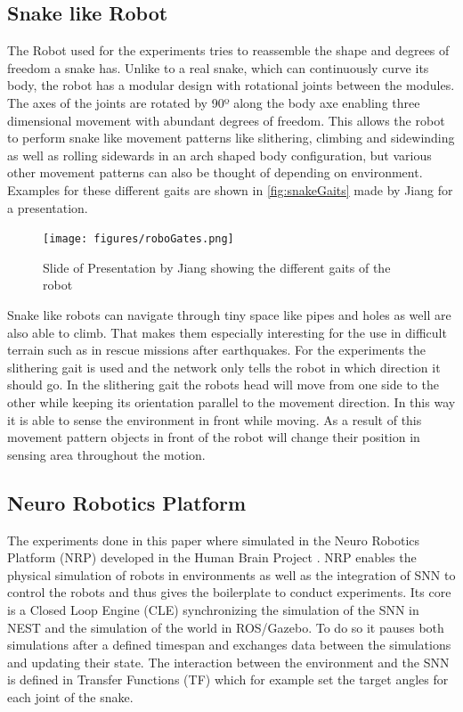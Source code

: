 \subsection{Snake like Robot}
The Robot used for the experiments tries to reassemble the shape and degrees of freedom a snake has. Unlike to a real snake, which can continuously curve its body, the robot has a modular design with rotational joints between the modules. The axes of the joints are rotated by 90º along the body axe enabling three dimensional movement with abundant degrees of freedom. This allows the robot to perform snake like movement patterns like slithering, climbing and sidewinding as well as rolling sidewards in an arch shaped body configuration, but various other movement patterns can also be thought of depending on environment. Examples for these different gaits are shown in \autoref{fig:snakeGaits} made by Jiang for a presentation\cite{snakeRobo}.
\newline
\begin{figure}[htpb]
  \centering
  \texttt{[image: figures/roboGates.png]}
  \caption{Slide of Presentation by Jiang showing the different gaits of the robot\cite{snakeRobo}}
  \label{fig:snakeGaits}
\end{figure}
Snake like robots can navigate through tiny space like pipes and holes as well are also able to climb. That makes them especially interesting for the use in difficult terrain such as in rescue missions after earthquakes.
For the experiments the slithering gait is used and the network only tells the robot in which direction it should go. In the slithering gait the robots head will move from one side to the other while keeping its orientation parallel to the movement direction. In this way it is able to sense the environment in front while moving. As a result of this movement pattern objects in front of the robot will change their position in sensing area throughout the motion.

\subsection{Neuro Robotics Platform}
The experiments done in this paper where simulated in the Neuro Robotics Platform (NRP) \cite{nrp} developed in the Human Brain Project \cite{hbp}. NRP enables the physical simulation of robots in environments as well as the integration of SNN to control the robots and thus gives the boilerplate to conduct experiments. Its core is a Closed Loop Engine (CLE) synchronizing the simulation of the SNN in NEST and the simulation of the world in ROS/Gazebo. To do so it pauses both simulations after a defined timespan and exchanges data between the simulations and updating their state. The interaction between the environment and the SNN is defined in Transfer Functions (TF) which for example set the target angles for each joint of the snake.




